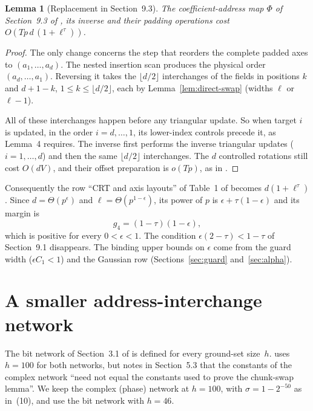 \documentclass[11pt]{article}
\numberwithin{equation}{section}
\numberwithin{table}{section}
\newtheorem{lemma}[theorem]{Lemma}
\theoremstyle{remark}
\newcommand{\OAI}{\cite{OAI}}
\begin{document}
\begin{lemma}[Replacement in Section~9.3]\label{lem:crt-moves}
The coefficient-address map $\Phi$ of Section~9.3 of \OAI, its inverse
and their padding operations cost $O(Tp\,d\,(1+\ell^\tau))$.
\end{lemma}

\begin{proof}
The only change concerns the step that reorders the complete padded
axes to $(a_1,\ldots,a_d)$. The nested insertion scan produces the
physical order $(a_d,\ldots,a_1)$. Reversing it takes the $\lfloor
d/2\rfloor$ interchanges of the fields in positions $k$ and $d+1-k$,
$1\le k\le\lfloor d/2\rfloor$, each by Lemma~\ref{lem:direct-swap}
(widths $\ell$ or $\ell-1$).

All of these interchanges happen before any triangular update. So when
target $i$ is updated, in the order $i=d,\dots,1$, its lower-index
controls precede it, as Lemma~4 requires. The inverse first performs the
inverse triangular updates ($i=1,\dots,d$) and then the same $\lfloor
d/2\rfloor$ interchanges. The $d$ controlled rotations still cost
$O(dV)$, and their offset preparation is $o(Tp)$, as in \OAI.
\end{proof}

Consequently the row ``CRT and axis layouts'' of Table~1 of \OAI{} becomes
$d(1+\ell^\tau)$. Since $d=\Theta(p^\epsilon)$ and
$\ell=\Theta(p^{1-\epsilon})$, its power of $p$ is
$\epsilon+\tau(1-\epsilon)$ and its margin is
\begin{equation}\label{eq:g4}
 g_4=(1-\tau)(1-\epsilon),
\end{equation}
which is positive for every $0<\epsilon<1$. The condition
$\epsilon(2-\tau)<1-\tau$ of Section~9.1 disappears. The binding upper
bounds on $\epsilon$ come from the guard width ($\epsilon C_1<1$) and
the Gaussian row (Sections~\ref{sec:guard} and~\ref{sec:alpha}).

\section{A smaller address-interchange network}\label{sec:network}

The bit network of Section~3.1 of \OAI{} is defined for every ground-set
size~$h$. \OAI{} uses $h=100$ for both networks, but notes in
Section~5.3 that the constants of the complex network ``need not equal
the constants used to prove the chunk-swap lemma''. We keep the complex
(phase) network at $h=100$, with $\sigma=1-2^{-50}$ as in~(10), and use
the bit network with $h=46$.
\end{document}
